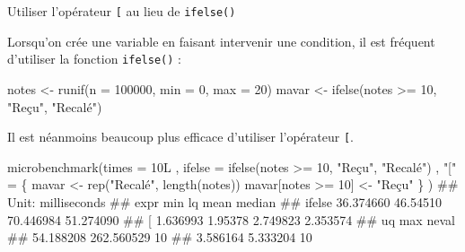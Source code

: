 \documentclass[12pt,handout,ignorenonframetext,]{beamer}
\newenvironment{Shaded}{}{}
\newcommand{\KeywordTok}[1]{\textcolor[rgb]{0.00,0.00,1.00}{#1}}
\newcommand{\DataTypeTok}[1]{#1}
\newcommand{\DecValTok}[1]{#1}
\newcommand{\StringTok}[1]{\textcolor[rgb]{0.00,0.50,0.50}{#1}}
\newcommand{\OperatorTok}[1]{#1}
\newcommand{\NormalTok}[1]{#1}
\renewenvironment{Shaded}{\begin{snugshade}}{\end{snugshade}}
\begin{document}
\begin{frame}[fragile]{Utiliser l'opérateur \texttt{{[}} au lieu de
\texttt{ifelse()}}

\small
Lorsqu'on crée une variable en faisant intervenir une condition, il est
fréquent d'utiliser la fonction \texttt{ifelse()} :

\footnotesize

\begin{Shaded}
\begin{Highlighting}[]
\NormalTok{notes <-}\StringTok{ }\KeywordTok{runif}\NormalTok{(}\DataTypeTok{n =} \DecValTok{100000}\NormalTok{, }\DataTypeTok{min =} \DecValTok{0}\NormalTok{, }\DataTypeTok{max =} \DecValTok{20}\NormalTok{)}
\NormalTok{mavar <-}\StringTok{ }\KeywordTok{ifelse}\NormalTok{(notes }\OperatorTok{>=}\StringTok{ }\DecValTok{10}\NormalTok{, }\StringTok{"Reçu"}\NormalTok{, }\StringTok{"Recalé"}\NormalTok{)}
\end{Highlighting}
\end{Shaded}

\pause \small
Il est néanmoins beaucoup plus efficace d'utiliser l'opérateur
\texttt{{[}}.

\footnotesize

\begin{Shaded}
\begin{Highlighting}[]
\KeywordTok{microbenchmark}\NormalTok{(}\DataTypeTok{times =}\NormalTok{ 10L}
\NormalTok{  , }\DataTypeTok{ifelse =} \KeywordTok{ifelse}\NormalTok{(notes }\OperatorTok{>=}\StringTok{ }\DecValTok{10}\NormalTok{, }\StringTok{"Reçu"}\NormalTok{, }\StringTok{"Recalé"}\NormalTok{)}
\NormalTok{  , }\StringTok{"["}\NormalTok{ =}\StringTok{ }\NormalTok{\{}
\NormalTok{    mavar <-}\StringTok{ }\KeywordTok{rep}\NormalTok{(}\StringTok{"Recalé"}\NormalTok{, }\KeywordTok{length}\NormalTok{(notes))}
\NormalTok{    mavar[notes }\OperatorTok{>=}\StringTok{ }\DecValTok{10}\NormalTok{] <-}\StringTok{ "Reçu"}
\NormalTok{  \} }
\NormalTok{)}
\NormalTok{  ## Unit: milliseconds}
\NormalTok{  ##    expr       min       lq      mean    median}
\NormalTok{  ##  ifelse 36.374660 46.54510 70.446984 51.274090}
\NormalTok{  ##       [  1.636993  1.95378  2.749823  2.353574}
\NormalTok{  ##         uq        max neval}
\NormalTok{  ##  54.188208 262.560529    10}
\NormalTok{  ##   3.586164   5.333204    10}
\end{Highlighting}
\end{Shaded}

\end{frame}
\end{document}
